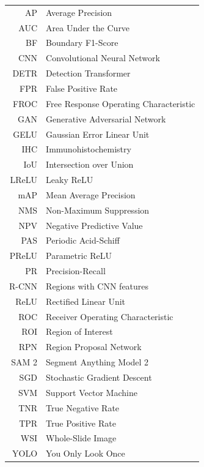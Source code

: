 \documentclass[english,master,oneside]{ctufit-thesis}
\begin{document}
\begin{tabular}{rl}
    AP    & Average Precision                              \\
	AUC   & Area Under the Curve                           \\
    BF    & Boundary F1-Score                              \\
    CNN   & Convolutional Neural Network                   \\
    DETR  & Detection Transformer                          \\
	FPR   & False Positive Rate                            \\
    FROC  & Free Response Operating Characteristic         \\
    GAN   & Generative Adversarial Network                 \\
    GELU  & Gaussian Error Linear Unit                     \\
    IHC   & Immunohistochemistry                           \\
    IoU   & Intersection over Union                        \\
    LReLU & Leaky ReLU                                     \\
	mAP   & Mean Average Precision                         \\
    NMS   & Non-Maximum Suppression                        \\
    NPV   & Negative Predictive Value                      \\
    PAS   & Periodic Acid-Schiff                           \\
    PReLU & Parametric ReLU                                \\
    PR    & Precision-Recall                               \\
    R-CNN & Regions with CNN features                      \\
    ReLU  & Rectified Linear Unit                          \\
    ROC   & Receiver Operating Characteristic              \\
    ROI   & Region of Interest                             \\
    RPN   & Region Proposal Network                        \\
    SAM 2 & Segment Anything Model 2                       \\
    SGD   & Stochastic Gradient Descent                    \\
    SVM   & Support Vector Machine                         \\
	TNR   & True Negative Rate                             \\
    TPR   & True Positive Rate                             \\
    WSI   & Whole-Slide Image                              \\
    YOLO  & You Only Look Once                             \\
\end{tabular}
\end{document}
